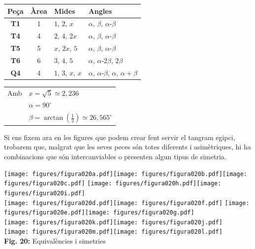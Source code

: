 \documentclass[a4paper,11pt]{article}
\begin{document}
\begin{multicols}{2}
            \begin{center}
                \begin{tabular}{c|c|l|l}
                    \textbf{Peça} & \textbf{Àrea} & \textbf{Mides} & \textbf{Angles} \\ \hline
                    \textbf{T1}   & 1    & $1$, $2$, $x$      & $\alpha$, $\beta$, $\alpha$-$\beta$   \\ \hline
                    \textbf{T4}   & 4    & $2$, $4$, $2x$     & $\alpha$, $\beta$, $\alpha$-$\beta$   \\ \hline
                    \textbf{T5}   & 5    & $x$, $2x$, $5$     & $\alpha$, $\beta$, $\alpha$-$\beta$   \\ \hline
                    \textbf{T6}   & 6    & $3$, $4$, $5$      & $\alpha$, $\alpha$-$2\beta$, $2\beta$ \\ \hline
                    \textbf{Q4}   & 4    & $1$, $3$, $x$, $x$ & $\alpha$, $\alpha$-$\beta$, $\alpha$, $\alpha\!+\!\beta$
                \end{tabular}
            \end{center}

            \begin{tabular}{ll}
                Amb & $x = \sqrt{5} \simeq 2,\!236$\\
                    & $\alpha = 90^\circ$ \\
                    & $\beta = \arctan{\left(\tfrac{1}{2}\right)} \simeq 26,\!565^\circ$
            \end{tabular}

            Si ens fixem ara en les figures que podem crear fent servir el tangram egipci, trobarem que, malgrat que les seves peces són totes diferents i asimètriques, hi ha combinacions que són intercanviables o presenten algun tipus de simetria.

            \begin{center}
                \texttt{[image: figures/figura020a.pdf]}\quad\texttt{[image: figures/figura020b.pdf]}\quad\texttt{[image: figures/figura020c.pdf]}\qquad
                \texttt{[image: figures/figura020h.pdf]}\quad\texttt{[image: figures/figura020i.pdf]} \\ \bigskip
                \texttt{[image: figures/figura020d.pdf]}\quad\texttt{[image: figures/figura020f.pdf]} \quad \texttt{[image: figures/figura020e.pdf]}\quad\texttt{[image: figures/figura020g.pdf]} \\ \bigskip
                \texttt{[image: figures/figura020k.pdf]}\quad\texttt{[image: figures/figura020j.pdf]} \\ \medskip
                \texttt{[image: figures/figura020m.pdf]}\quad\texttt{[image: figures/figura020l.pdf]} \\\footnotesize{\textbf{Fig. 20:} Equivalències i simetries}
            \end{center}


\end{multicols}
\end{document}
